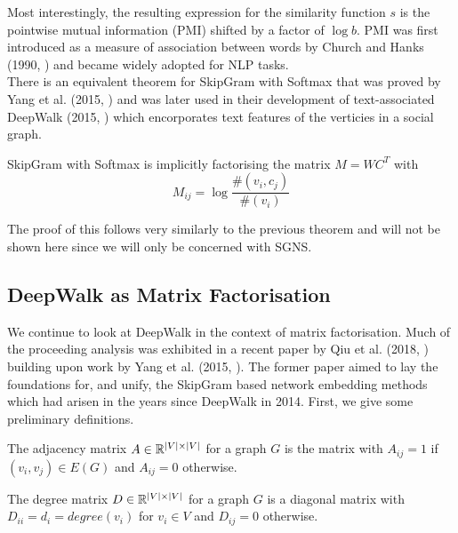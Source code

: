 \documentclass[a4paper]{article}
\begin{document}
\noindent Most interestingly, the resulting expression for the similarity function $s$ is
the pointwise mutual information (PMI) shifted by a factor of $\log b$. PMI was
first introduced as a measure of association between words by Church and Hanks
(1990, \cite{church1990}) and became widely adopted for NLP tasks.\\
There is an equivalent theorem for SkipGram with Softmax that was proved by Yang
et al. (2015, \cite{yangalternative2015}) and was later used in their development of
text-associated DeepWalk (2015, \cite{yang2015}) which encorporates text features
of the verticies in a social graph.

\begin{theorem}[Yang et al. (2015)]
  SkipGram with Softmax is implicitly factorising the matrix $M = WC^T$ with
  \[M_{ij} = \log{\frac{\#(v_i,c_j)}{\#(v_i)}}\]
\end{theorem}
The proof of this follows very similarly to the previous theorem and will not be
shown here since we will only be concerned with SGNS.

\subsection{DeepWalk as Matrix Factorisation}
We continue to look at DeepWalk in the context of matrix factorisation. Much of the proceeding analysis was exhibited in a recent paper by Qiu et
al. (2018, \cite{qiu2018}) building upon work by Yang et al. (2015, \cite{yang2015}). The former paper aimed to lay the foundations for, and
unify, the SkipGram based network embedding methods which had arisen in the years since DeepWalk in 2014. First, we give some preliminary definitions.
\begin{definition}
  The adjacency matrix $A \in \R^{|V| \times |V|}$ for a graph $G$ is the matrix with $A_{ij} = 1$ if $(v_i, v_j) \in E(G)$ and $A_{ij} = 0$ otherwise.
\end{definition}

\begin{definition}
  The degree matrix $D \in \R^{|V| \times |V|}$ for a graph $G$ is a diagonal
  matrix with $D_{ii} = d_i = degree(v_i)$ for $v_i \in V$ and $D_{ij} = 0$ otherwise.
\end{definition}
\end{document}
